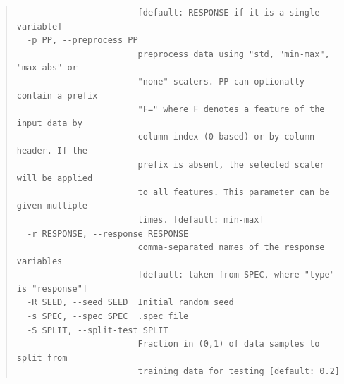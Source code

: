 \documentclass[a4paper,parskip=half]{article} %
\newenvironment{cmdhelp}{\begin{quote}\footnotesize}{\end{quote}}
\begin{document}
\begin{cmdhelp}
\begin{verbatim}
                        [default: RESPONSE if it is a single variable]
  -p PP, --preprocess PP
                        preprocess data using "std, "min-max", "max-abs" or
                        "none" scalers. PP can optionally contain a prefix
                        "F=" where F denotes a feature of the input data by
                        column index (0-based) or by column header. If the
                        prefix is absent, the selected scaler will be applied
                        to all features. This parameter can be given multiple
                        times. [default: min-max]
  -r RESPONSE, --response RESPONSE
                        comma-separated names of the response variables
                        [default: taken from SPEC, where "type" is "response"]
  -R SEED, --seed SEED  Initial random seed
  -s SPEC, --spec SPEC  .spec file
  -S SPLIT, --split-test SPLIT
                        Fraction in (0,1) of data samples to split from
                        training data for testing [default: 0.2]
\end{verbatim}\end{cmdhelp}
\end{document}

